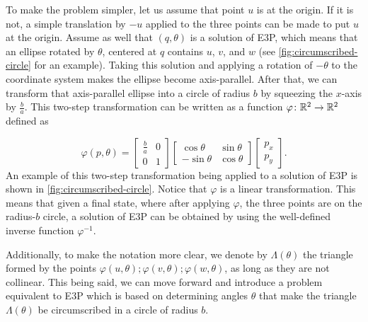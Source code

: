 To make the problem simpler, let us assume that point $u$ is at the origin. If it is not, a simple translation by $-u$ applied to the three points can be made to put $u$ at the origin.
Assume as well that $(q, \theta)$ is a solution of E3P, which means that an ellipse rotated by $\theta$, centered at $q$ contains $u$, $v$, and $w$ (see \autoref{fig:circumscribed-circle} for an example).
Taking this solution and applying a rotation of $-\theta$ to the coordinate system makes the ellipse become axis-parallel.
After that, we can transform that axis-parallel ellipse into a circle of radius $b$ by squeezing the $x$-axis by $\frac{b}{a}$. This two-step transformation can be written as a function $\varphi\colon \mathbb{R}^2 \to \mathbb{R}^2$ defined as

\begin{equation}\label{eq:trpnts}
\varphi(p, \theta)=\left[\begin{array}{cc}
\frac{b}{a}&0\\
0&1
\end{array}\right]
\left[\begin{array}{cc}
\cos{\theta}&\sin{\theta}\\
-\sin{\theta}&\cos{\theta}
\end{array}\right]\left[\begin{array}{c}
p_x\\
p_y
\end{array}\right].
\end{equation}
An example of this two-step transformation being applied to a solution of E3P is shown in \autoref{fig:circumscribed-circle}. 
Notice that $\varphi$ is a linear transformation. This means that given a final state, where after applying $\varphi$, the three points are on the radius-$b$ circle, a solution of E3P can be obtained by using the well-defined inverse function $\varphi^{-1}$.

Additionally, to make the notation more clear, we denote by $\Lambda(\theta)$ the triangle formed by the points $\varphi(u,\theta); \varphi(v, \theta); \varphi(w, \theta)$, as long as they are not collinear.
This being said, we can move forward and introduce a problem equivalent to E3P which is based on determining angles $\theta$ that make the triangle $\Lambda(\theta)$ be circumscribed in a circle of radius $b$.

